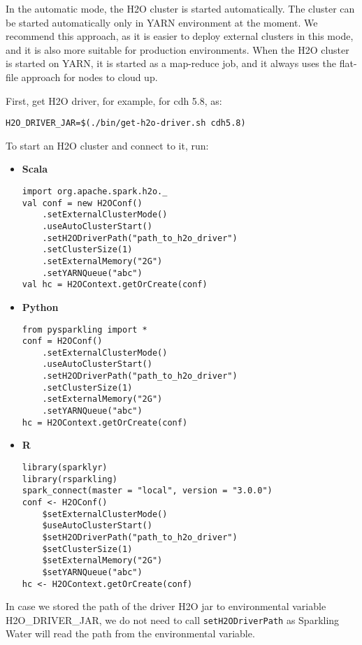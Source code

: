 In the automatic mode, the H2O cluster is started automatically. The cluster can be started automatically only in YARN
environment at the moment. We recommend this approach, as it is easier to deploy external clusters in this mode,
and it is also more suitable for production environments. When the H2O cluster is started on YARN, it is started
as a map-reduce job, and it always uses the flat-file approach for nodes to cloud up.

First, get H2O driver, for example, for cdh 5.8, as:

\begin{lstlisting}[style=bash]
H2O_DRIVER_JAR=$(./bin/get-h2o-driver.sh cdh5.8)
\end{lstlisting}


To start an H2O cluster and connect to it, run:

\begin{itemize}
    \item \textbf{Scala} \begin{lstlisting}[style=Scala]
import org.apache.spark.h2o._
val conf = new H2OConf()
    .setExternalClusterMode()
    .useAutoClusterStart()
    .setH2ODriverPath("path_to_h2o_driver")
    .setClusterSize(1)
    .setExternalMemory("2G")
    .setYARNQueue("abc")
val hc = H2OContext.getOrCreate(conf)
    \end{lstlisting}
    \item \textbf{Python} \begin{lstlisting}[style=Python]
from pysparkling import *
conf = H2OConf()
    .setExternalClusterMode()
    .useAutoClusterStart()
    .setH2ODriverPath("path_to_h2o_driver")
    .setClusterSize(1)
    .setExternalMemory("2G")
    .setYARNQueue("abc")
hc = H2OContext.getOrCreate(conf)
    \end{lstlisting}
    \item \textbf{R} \begin{lstlisting}[style=R]
library(sparklyr)
library(rsparkling)
spark_connect(master = "local", version = "3.0.0")
conf <- H2OConf()
    $setExternalClusterMode()
    $useAutoClusterStart()
    $setH2ODriverPath("path_to_h2o_driver")
    $setClusterSize(1)
    $setExternalMemory("2G")
    $setYARNQueue("abc")
hc <- H2OContext.getOrCreate(conf)
    \end{lstlisting}
\end{itemize}

In case we stored the path of the driver H2O jar to environmental variable H2O\_DRIVER\_JAR, we do not need
to call \texttt{setH2ODriverPath} as Sparkling Water will read the path from the environmental variable.

